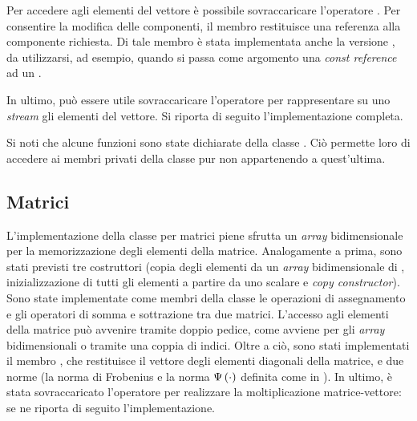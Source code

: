 Per accedere agli elementi del vettore \`e possibile sovraccaricare
l'operatore \cpp{[]}. Per consentire la modifica delle componenti, il
membro  restituisce una referenza alla componente
richiesta. Di tale membro \`e stata implementata anche la versione
, da utilizzarsi, ad esempio, quando si passa come
argomento una \emph{const reference} ad un .

In ultimo, pu\`o essere utile sovraccaricare l'operatore \cpp{<%
<} per rappresentare su uno \emph{stream} gli elementi del vettore. Si
riporta di seguito l'implementazione completa.
%
\lstset{basicstyle=\scriptsize\sf}


\lstset{basicstyle=\sf}

Si noti che alcune funzioni sono state dichiarate  della
classe . Ci\`o permette loro di accedere ai membri privati
della classe pur non appartenendo a quest'ultima.

\subsection*{Matrici}
L'implementazione della classe  per matrici
piene sfrutta un \emph{array} bidimensionale per la memorizzazione
degli elementi della matrice. Analogamente a prima, sono stati
previsti tre costruttori (copia degli elementi da un \emph{array}
bidimensionale di , inizializzazione di tutti gli elementi
a partire da uno scalare e \emph{copy constructor}). Sono state
implementate come membri della classe le operazioni di assegnamento e
gli operatori di somma e sottrazione tra due matrici. L'accesso agli
elementi della matrice pu\`o avvenire tramite doppio pedice, come
avviene per gli \emph{array} bidimensionali o tramite una coppia di
indici. Oltre a ci\`o, sono stati implementati il membro ,
che restituisce il vettore degli elementi diagonali della matrice, e
due norme (la norma di Frobenius e la norma $\Psi\left( \cdot\right)$
definita come in \cite[]{Quarteroni.Sacco.ea:2000}). In
ultimo, \`e stata sovraccaricato l'operatore \cpp{*} per realizzare la
moltiplicazione matrice-vettore: se ne riporta di seguito
l'implementazione.

